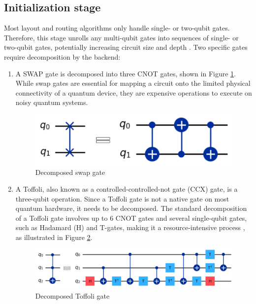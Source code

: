 \subsection{Initialization stage} %
Most layout and routing algorithms only handle single- or two-qubit gates. Therefore, this stage unrolls any multi-qubit gates into sequences of single- or two-qubit gates, potentially increasing circuit size and depth \cite{ding_circuit_2020}. Two specific gates require decomposition by the backend:
\begin{enumerate}[nolistsep]
    \item A SWAP gate is decomposed into three CNOT gates, shown in Figure \ref{fig:swap-decompose}. While swap gates are essential for mapping a circuit onto the limited physical connectivity of a quantum device, they are expensive operations to execute on noisy quantum systems.
    \begin{figure}[h]
        \centering
        \includegraphics[width=0.5\linewidth]{image/swap decompose.png}
        \caption{Decomposed swap gate}
        \label{fig:swap-decompose}
    \end{figure}

    \item A Toffoli, also known as a controlled-controlled-not gate (CCX) gate, is a three-qubit operation. Since a Toffoli gate is not a native gate on most quantum hardware, it needs to be decomposed. The standard decomposition of a Toffoli gate involves up to 6 CNOT gates and several single-qubit gates, such as Hadamard (H) and T-gates, making it a resource-intensive process \cite{shende_toffoli_2008}, as illustrated in Figure \ref{fig:toffoli-decompose}.
    \begin{figure}[h]
        \centering
        \includegraphics[width=0.6\linewidth]{image/toffoli decompose.png}
        \caption{Decomposed Toffoli gate}
        \label{fig:toffoli-decompose}
    \end{figure}
\end{enumerate}

